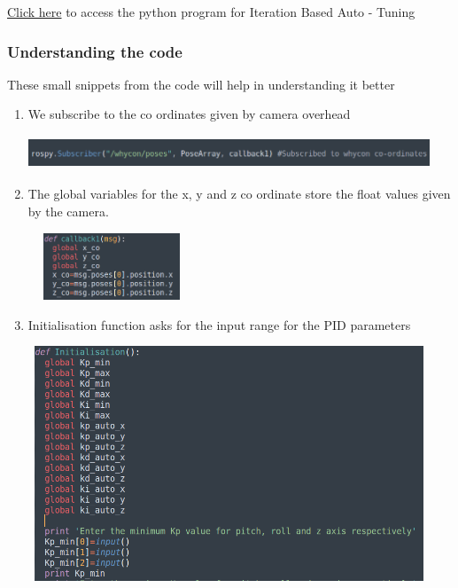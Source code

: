\documentclass[a4paper,12pt,oneside]{book}
\begin{document}
\href{https://github.com/eYSIP-2018/Autotuning-of-Controller-For-Drone/blob/Amit-Kumar/Auto_Tuning.py}{Click here} to access the python program for Iteration Based Auto - Tuning\\


\subsubsection{Understanding the code }

These small snippets from the code will help in understanding it better

\begin{enumerate}
\item We subscribe to the co ordinates given by camera overhead


\hspace{0.5cm}\includegraphics[width = 12cm , height= 1cm]{whycon_1.png}

\item The global variables for the x, y and z co ordinate store the float values given by the camera.


\includegraphics[width = 5cm , height= 2cm]{Callback_2.png}


\item Initialisation function asks for the input range for the PID parameters


\includegraphics[width = 12cm , height= 7cm]{Initialisation_3.png}



\end{enumerate}
\end{document}
